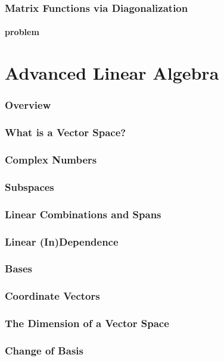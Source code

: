 \documentclass{article}
\begin{document}
\section{Matrix Functions via Diagonalization}
\subsection{problem}
\begin{enumerate}
\end{enumerate}

\part{Advanced Linear Algebra}

\section{Overview}

\section{What is a Vector Space?}
\section{Complex Numbers}
\section{Subspaces}
\section{Linear Combinations and Spans}
\section{Linear (In)Dependence}
\section{Bases}
\section{Coordinate Vectors}
\section{The Dimension of a Vector Space}
\section{Change of Basis}
\end{document}

